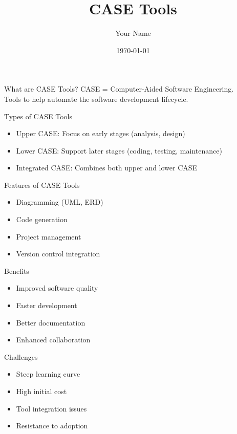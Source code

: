 \documentclass[aspectratio=169]{beamer}
\title{CASE Tools}
\author{Your Name}
\date{\today}
\begin{document}
\begin{frame}
  \titlepage
\end{frame}

\begin{frame}{What are CASE Tools?}
  CASE = Computer-Aided Software Engineering. \\
  Tools to help automate the software development lifecycle.
\end{frame}

\begin{frame}{Types of CASE Tools}
  \begin{itemize}
    \item Upper CASE: Focus on early stages (analysis, design)
    \item Lower CASE: Support later stages (coding, testing, maintenance)
    \item Integrated CASE: Combines both upper and lower CASE
  \end{itemize}
\end{frame}

\begin{frame}{Features of CASE Tools}
  \begin{itemize}
    \item Diagramming (UML, ERD)
    \item Code generation
    \item Project management
    \item Version control integration
  \end{itemize}
\end{frame}

\begin{frame}{Benefits}
  \begin{itemize}
    \item Improved software quality
    \item Faster development
    \item Better documentation
    \item Enhanced collaboration
  \end{itemize}
\end{frame}

\begin{frame}{Challenges}
  \begin{itemize}
    \item Steep learning curve
    \item High initial cost
    \item Tool integration issues
    \item Resistance to adoption
  \end{itemize}
\end{frame}
\end{document}
